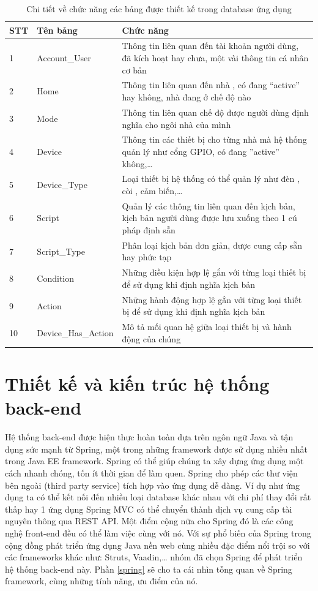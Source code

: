 \documentclass[12pt,a4paper,oneside]{extbook}
\begin{document}
\begin{table}
\centering
\caption{Chi tiết về chức năng các bảng được thiết kế trong database ứng dụng}\label{tab:db-tables}
\begin{tabular}{ |l|l|p{10cm}| } 
 \hline
	STT &	Tên bảng &	Chức năng\\ \hline
	1 &	Account\_User &	Thông tin liên quan đến tài khoản người dùng, đã kích hoạt hay chưa, một vài thông tin cá nhân cơ bản\\ \hline
	2 &	Home &	Thông tin liên quan đến nhà , có đang “active” hay không, nhà đang ở chế độ nào\\ \hline
	3 &	Mode &	Thông tin liên quan chế độ được người dùng định nghĩa cho ngôi nhà của mình\\ \hline
	4 &	Device &	Thông tin các thiết bị cho từng nhà  mà hệ thống quản lý như cổng GPIO, có đang ”active” không,\dots\\ \hline
	5 &	Device\_Type &	Loại thiết bị hệ thống có thể quản lý như đèn , còi , cảm biến,\dots\\ \hline
	6 &	Script &	Quản lý các thông tin liên quan đến kịch bản, kịch bản người dùng được lưu xuống theo 1 cú pháp định sẵn\\ \hline
	7 &	Script\_Type &	Phân loại kịch bản đơn giản, được cung cấp sẵn hay phức tạp\\ \hline
	8 &	Condition &	Những điều kiện hợp lệ gắn với từng loại thiết bị để sử dụng khi định nghĩa kịch bản\\ \hline
	9 &	Action &	Những hành động hợp lệ gắn với từng loại thiết bị để sử dụng khi định nghĩa kịch bản\\ \hline
	10 &	Device\_Has\_Action &	Mô tả mối quan hệ giữa loại thiết bị và hành động của chúng\\
 \hline
\end{tabular}
\end{table}

\section{Thiết kế và kiến trúc hệ thống back-end}

Hệ thống back-end được hiện thực hoàn toàn dựa trên ngôn ngữ Java và tận dụng sức mạnh từ Spring, một trong những framework được sử dụng nhiều nhất trong Java EE framework. 
Spring có thể giúp chúng ta xây dựng ứng dụng một cách nhanh chóng, tốn ít thời gian để làm quen. Spring cho phép các thư viện bên ngoài (third party service) tích hợp vào ứng dụng dễ dàng. Ví dụ như ứng dụng ta có thể kết nối đến nhiều loại database khác nhau với chi phí thay đổi rất thấp hay 1 ứng dụng Spring MVC có thể chuyển thành dịch vụ cung cấp tài nguyên thông qua REST API. Một điểm cộng nữa cho Spring đó là các công nghệ front-end đều có thể làm việc cùng với nó. Với sự phổ biến của Spring trong cộng đồng phát triển ứng dụng Java nền web cùng nhiều đặc điểm nổi trội so với các frameworks khác như: Struts, Vaadin,\dots\hspace{0mm} nhóm đã chọn Spring để phát triển hệ thống back-end này. Phần \ref{spring} sẽ cho ta cái nhìn tỗng quan về Spring framework, cùng những tính năng, ưu điểm của nó.
\end{document}
